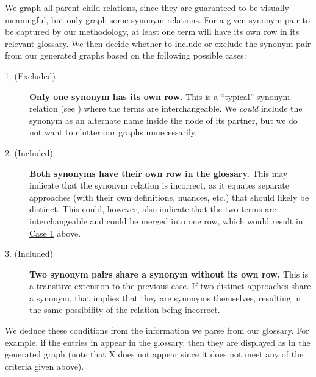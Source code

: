     

    \ExampleGraph{}

    \newpage\fi
We graph all parent-child relations, since they are guaranteed to be visually
meaningful, but only graph some synonym relations. For a given synonym pair to
be captured by our methodology, at least one term will have its own row in its
relevant glossary. We then decide whether to include or exclude the synonym
pair from our generated graphs based on the following possible cases:
\begin{description}
    \item[1. (Excluded)] \label{case-one}
          \ifnotpaper\else \hfill\break \fi
          \textbf{Only one synonym has its own row.}
          This is a ``typical'' synonym relation (see ) where
          the terms are interchangeable. We \emph{could} include the synonym
          as an alternate name inside the node of its partner, but we do not
          want to clutter our graphs unnecessarily.

    \item[2. (Included)] \label{case-two}
          \ifnotpaper\else \hfill\break \fi
          \textbf{Both synonyms have their own row in the glossary.}
          This may indicate that the synonym relation is incorrect, as it
          equates separate approaches (with their own definitions, nuances,
          etc.) that should likely be distinct. This could, however, also
          indicate that the two terms are interchangeable and could be merged
          into one row, which would result in \hyperref[case-one]{Case 1} above.

    \item[3. (Included)] \label{case-three}
          \ifnotpaper\else\hfill\break\fi
          \textbf{Two synonym pairs share a synonym without its own row.}
          This is a transitive extension to the previous case. If
          two distinct approaches share a synonym, that implies that they are
          synonyms themselves, resulting in the same possibility of the
          relation being incorrect.
\end{description}
\ifnotpaper
    
    We deduce these conditions from the information we parse from our
    glossary. For example, if the entries in 
    appear in the glossary, then they are displayed as 
    in the generated graph (note that X does not appear since it does not
    meet any of the criteria given above).

